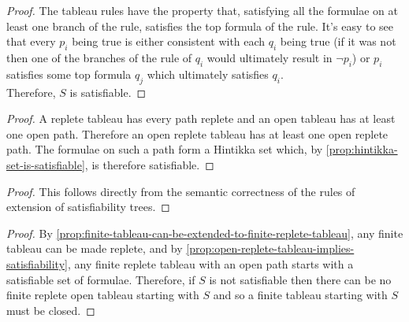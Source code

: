 \documentclass[../MathsNotesBase.tex]{subfiles}
\begin{document}
{\begin{proof}
 			The tableau rules have the property that, satisfying all the formulae on at least one branch of the rule, satisfies the top formula of the rule. It's easy to see that every $p_i$ being true is either consistent with each $q_i$ being true (if it was not then one of the branches of the rule of $q_i$ would ultimately result in $\lnot p_i$) or $p_i$ satisfies some top formula $q_j$ which ultimately satisfies $q_i$.\\
 			
 			Therefore, $S$ is satisfiable.
 		\end{proof}
 	
 		\bigskip
 		\begin{proof}
 			A replete tableau has every path replete and an open tableau has at least one open path. Therefore an open replete tableau has at least one open replete path. The formulae on such a path form a Hintikka set which, by \autoref{prop:hintikka-set-is-satisfiable}, is therefore satisfiable.{\tiny }
 		\end{proof}
 	
 		\bigskip
 		\begin{proof}
 			This follows directly from the semantic correctness of the rules of extension of satisfiability trees.
 		\end{proof}
 	
 		\bigskip
 		\begin{proof}
 			By \autoref{prop:finite-tableau-can-be-extended-to-finite-replete-tableau}, any finite tableau can be made replete, and by \autoref{prop:open-replete-tableau-implies-satisfiability}, any finite replete tableau with an open path starts with a satisfiable set of formulae. Therefore, if $S$ is not satisfiable then there can be no finite replete open tableau starting with $S$ and so a finite tableau starting with $S$ must be closed.
 		\end{proof}
 	
}
\end{document}
